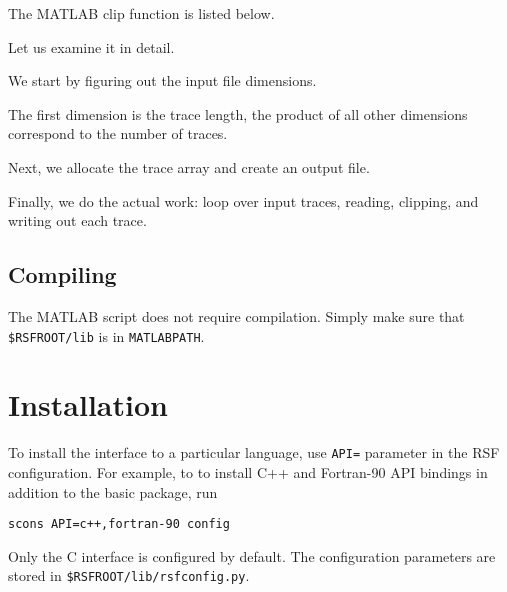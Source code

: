 \lstset{language=matlab}

The MATLAB clip function is listed below.



Let us examine it in detail. 


We start by figuring out the input file dimensions.


The first dimension is the trace length, the product of all other
dimensions correspond to the number of traces.


Next, we allocate the trace array and create an output file.


Finally, we do the actual work: loop over input traces, reading,
clipping, and writing out each trace.

\subsection{Compiling}

The MATLAB script does not require compilation. Simply make sure that
\texttt{\$RSFROOT/lib} is in \texttt{MATLABPATH}.

\section{Installation} 

To install the interface to a particular language, use \texttt{API=}
parameter in the RSF configuration. For example, to to install C++ and
Fortran-90 API bindings in addition to the basic package, run
\begin{verbatim}
scons API=c++,fortran-90 config
\end{verbatim}
Only the C interface is configured by default. The configuration
parameters are stored in \texttt{\$RSFROOT/lib/rsfconfig.py}.

 


